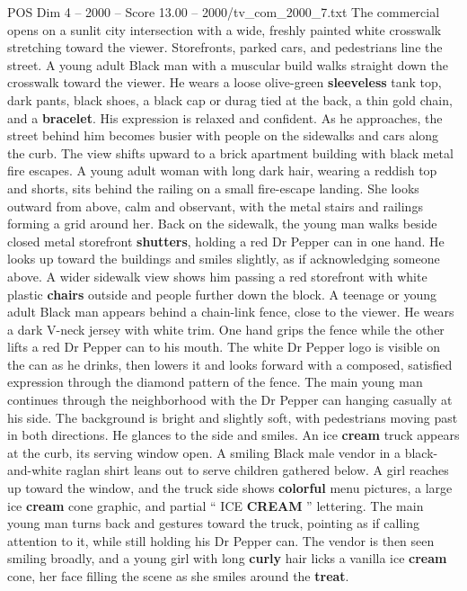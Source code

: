 \begin{textsample}{POS Dim 4 – 2000 – Score 13.00 – 2000/tv\_com\_2000\_7.txt}  \label{ex:f4_pos_057}
The commercial opens on a sunlit city intersection with a wide, freshly painted white crosswalk stretching toward the viewer.
Storefronts, parked cars, and pedestrians line the street.
A young adult Black man with a muscular build walks straight down the crosswalk toward the viewer.
He wears a loose olive-green \textbf{sleeveless} tank top, dark pants, black shoes, a black cap or durag tied at the back, a thin gold chain, and a \textbf{bracelet}.
His expression is relaxed and confident.
As he approaches, the street behind him becomes busier with people on the sidewalks and cars along the curb.
The view shifts upward to a brick apartment building with black metal fire escapes.
A young adult woman with long dark hair, wearing a reddish top and shorts, sits behind the railing on a small fire-escape landing.
She looks outward from above, calm and observant, with the metal stairs and railings forming a grid around her.
Back on the sidewalk, the young man walks beside closed metal storefront \textbf{shutters}, holding a red Dr Pepper can in one hand.
He looks up toward the buildings and smiles slightly, as if acknowledging someone above.
A wider sidewalk view shows him passing a red storefront with white plastic \textbf{chairs} outside and people further down the block.
A teenage or young adult Black man appears behind a chain-link fence, close to the viewer.
He wears a dark V-neck jersey with white trim.
One hand grips the fence while the other lifts a red Dr Pepper can to his mouth.
The white Dr Pepper logo is visible on the can as he drinks, then lowers it and looks forward with a composed, satisfied expression through the diamond pattern of the fence.
The main young man continues through the neighborhood with the Dr Pepper can hanging casually at his side.
The background is bright and slightly soft, with pedestrians moving past in both directions.
He glances to the side and smiles.
An ice \textbf{cream} truck appears at the curb, its serving window open.
A smiling Black male vendor in a black-and-white raglan shirt leans out to serve children gathered below.
A girl reaches up toward the window, and the truck side shows \textbf{colorful} menu pictures, a large ice \textbf{cream} cone graphic, and partial “ ICE \textbf{CREAM} ” lettering.
The main young man turns back and gestures toward the truck, pointing as if calling attention to it, while still holding his Dr Pepper can.
The vendor is then seen smiling broadly, and a young girl with long \textbf{curly} hair licks a vanilla ice \textbf{cream} cone, her face filling the scene as she smiles around the \textbf{treat}.

\end{textsample}
